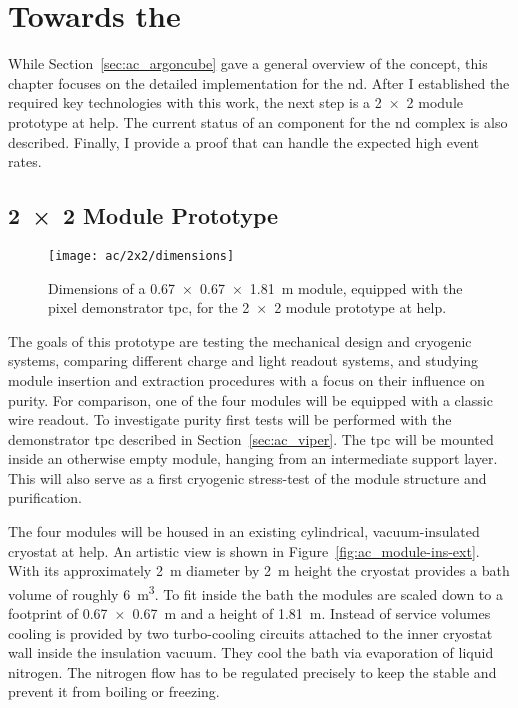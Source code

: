 \chapter{Towards the  }
\label{chap:dune-nd}

While Section~\ref{sec:ac_argoncube} gave a general overview of the \AC{} concept, this chapter focuses on the detailed implementation for the \dune{} \gls{nd}.
After I established the required key technologies with this work, the next step is a \num{2 x 2} module prototype at \gls{help}.
The current status of an \AC{} \lartpc{} component for the \dune{} \gls{nd} complex is also described.
Finally, I provide a proof that \AC{} can handle the expected high event rates.


\section{\num{2 x 2} Module \AC{} Prototype}
\label{sec:dune-nd_ac-2x2}

\begin{figure}[tbp]
	\centering
	\texttt{[image: ac/2x2/dimensions]}
	\caption[\AC{} \num{2 x 2} prototype module dimensions]{%
		Dimensions of a \SI{0.67 x 0.67 x 1.81}{\metre} module, equipped with the pixel demonstrator \acrshort{tpc}, for the \num{2 x 2} module \AC{} prototype at \acrshort{help}.
	}
	\label{fig:2x2_dim}
\end{figure}

The goals of this prototype are testing the mechanical design and cryogenic systems, comparing different charge and light readout systems, and studying module insertion and extraction procedures with a focus on their influence on purity.
For comparison, one of the four modules will be equipped with a classic wire readout.
To investigate purity first tests will be performed with the \AC{} demonstrator \gls{tpc} described in Section~\ref{sec:ac_viper}.
The \gls{tpc} will be mounted inside an otherwise empty module, hanging from an intermediate support layer.
This will also serve as a first cryogenic stress-test of the module structure and \lar{} purification.

The four modules will be housed in an existing cylindrical, vacuum-insulated cryostat at \gls{help}.
An artistic view is shown in Figure~\ref{fig:ac_module-ins-ext}.
With its approximately \SI{2}{\metre} diameter by \SI{2}{\metre} height the cryostat provides a \lar{} bath volume of roughly \SI{6}{\metre\cubed}.
To fit inside the bath the modules are scaled down to a footprint of \SI{0.67 x 0.67}{\metre} and a height of \SI{1.81}{\metre}.
Instead of service volumes cooling is provided by two turbo-cooling circuits attached to the inner cryostat wall inside the insulation vacuum.
They cool the \lar{} bath via evaporation of liquid nitrogen.
The nitrogen flow has to be regulated precisely to keep the \lar{} stable and prevent it from boiling or freezing.


